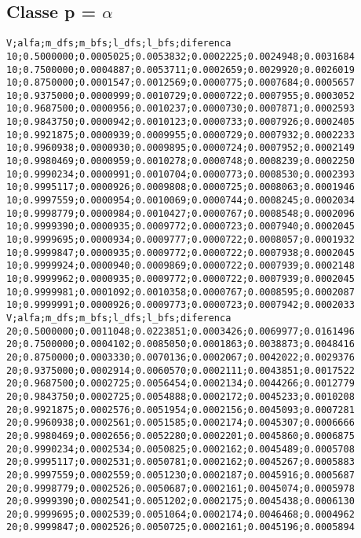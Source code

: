 \documentclass[brazil,times]{abnt}
\begin{document}
\subsection*{Classe p = $\alpha$}
{\scriptsize \begin{verbatim}
V;alfa;m_dfs;m_bfs;l_dfs;l_bfs;diferenca
10;0.5000000;0.0005025;0.0053832;0.0002225;0.0024948;0.0031684
10;0.7500000;0.0004887;0.0053711;0.0002659;0.0029920;0.0026019
10;0.8750000;0.0001547;0.0012569;0.0000775;0.0007684;0.0005657
10;0.9375000;0.0000999;0.0010729;0.0000722;0.0007955;0.0003052
10;0.9687500;0.0000956;0.0010237;0.0000730;0.0007871;0.0002593
10;0.9843750;0.0000942;0.0010123;0.0000733;0.0007926;0.0002405
10;0.9921875;0.0000939;0.0009955;0.0000729;0.0007932;0.0002233
10;0.9960938;0.0000930;0.0009895;0.0000724;0.0007952;0.0002149
10;0.9980469;0.0000959;0.0010278;0.0000748;0.0008239;0.0002250
10;0.9990234;0.0000991;0.0010704;0.0000773;0.0008530;0.0002393
10;0.9995117;0.0000926;0.0009808;0.0000725;0.0008063;0.0001946
10;0.9997559;0.0000954;0.0010069;0.0000744;0.0008245;0.0002034
10;0.9998779;0.0000984;0.0010427;0.0000767;0.0008548;0.0002096
10;0.9999390;0.0000935;0.0009772;0.0000723;0.0007940;0.0002045
10;0.9999695;0.0000934;0.0009777;0.0000722;0.0008057;0.0001932
10;0.9999847;0.0000935;0.0009772;0.0000722;0.0007938;0.0002045
10;0.9999924;0.0000940;0.0009869;0.0000722;0.0007939;0.0002148
10;0.9999962;0.0000935;0.0009772;0.0000722;0.0007939;0.0002045
10;0.9999981;0.0001092;0.0010358;0.0000767;0.0008595;0.0002087
10;0.9999991;0.0000926;0.0009773;0.0000723;0.0007942;0.0002033
V;alfa;m_dfs;m_bfs;l_dfs;l_bfs;diferenca
20;0.5000000;0.0011048;0.0223851;0.0003426;0.0069977;0.0161496
20;0.7500000;0.0004102;0.0085050;0.0001863;0.0038873;0.0048416
20;0.8750000;0.0003330;0.0070136;0.0002067;0.0042022;0.0029376
20;0.9375000;0.0002914;0.0060570;0.0002111;0.0043851;0.0017522
20;0.9687500;0.0002725;0.0056454;0.0002134;0.0044266;0.0012779
20;0.9843750;0.0002725;0.0054888;0.0002172;0.0045233;0.0010208
20;0.9921875;0.0002576;0.0051954;0.0002156;0.0045093;0.0007281
20;0.9960938;0.0002561;0.0051585;0.0002174;0.0045307;0.0006666
20;0.9980469;0.0002656;0.0052280;0.0002201;0.0045860;0.0006875
20;0.9990234;0.0002534;0.0050825;0.0002162;0.0045489;0.0005708
20;0.9995117;0.0002531;0.0050781;0.0002162;0.0045267;0.0005883
20;0.9997559;0.0002559;0.0051230;0.0002187;0.0045916;0.0005687
20;0.9998779;0.0002526;0.0050687;0.0002161;0.0045074;0.0005978
20;0.9999390;0.0002541;0.0051202;0.0002175;0.0045438;0.0006130
20;0.9999695;0.0002539;0.0051064;0.0002174;0.0046468;0.0004962
20;0.9999847;0.0002526;0.0050725;0.0002161;0.0045196;0.0005894

\end{verbatim}}
\end{document}
